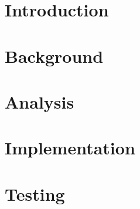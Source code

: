 




\thispagestyle{empty}
\cleardoublepage

\thispagestyle{plain}


\cleardoublepage

\setcounter{secnumdepth}{2} %
\setcounter{tocdepth}{2} %
\tableofcontents*


\chapter{Introduction}


\chapter{Background}
\label{bg}






% 
\newpage

\chapter{Analysis}
\label{an}


\newpage

\chapter{Implementation}
\label{im}







\newpage

\chapter{Testing}
\label{te}


